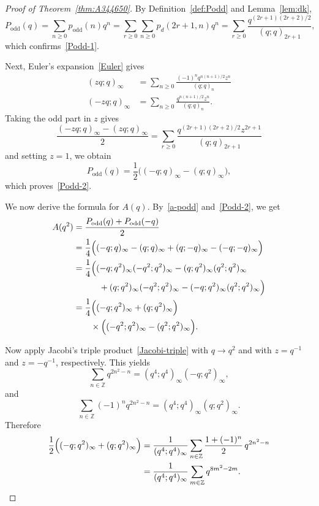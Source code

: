 \documentclass[reqno]{amsart}
\theoremstyle{plain}
\theoremstyle{definition}
\theoremstyle{remark}
\numberwithin{equation}{section}
\newcommand{\qpoch}[2]{(#1;#2)_\infty}
\newcommand{\qpochn}[3]{(#1;#2)_{#3}}
\begin{document}
\begin{proof}[Proof of Theorem~\ref{thm:A344650}]
%
By Definition~\ref{def:Podd} and Lemma~\ref{lem:dk},
\[
P_{\mathrm{odd}}(q)
=\sum_{n\ge 0} p_{\mathrm{odd}}(n)q^n
=\sum_{r\ge 0}\sum_{n\ge 0} p_d(2r+1,n)q^n
=\sum_{r\ge 0}\frac{q^{(2r+1)(2r+2)/2}}{\qpochn{q}{q}{2r+1}},
\]
which confirms~\eqref{Podd-1}.

Next, Euler's expansion~\eqref{Euler} gives
\begin{align*}
\qpoch{zq}{q}
&=\sum_{n\ge 0}\frac{(-1)^n q^{n(n+1)/2}z^n}{\qpochn{q}{q}{n}} \\
\qpoch{-zq}{q}
&=\sum_{n\ge 0}\frac{q^{n(n+1)/2}z^n}{\qpochn{q}{q}{n}}.
\end{align*}
Taking the odd part in $z$ gives
\[
\frac{\qpoch{-zq}{q}-\qpoch{zq}{q}}{2}
=\sum_{r\ge 0}\frac{q^{(2r+1)(2r+2)/2}z^{2r+1}}{\qpochn{q}{q}{2r+1}}
\]
and setting $z=1$, we obtain
\[
P_{\mathrm{odd}}(q)=\frac12\bigl(\qpoch{-q}{q}-\qpoch{q}{q}\bigr),
\]
which proves~\eqref{Podd-2}.

We now derive the formula for $A(q)$. By~\eqref{a-podd} and~\eqref{Podd-2}, we get
\begin{align}
A(q^2)
&=\frac{P_{\mathrm{odd}}(q)+P_{\mathrm{odd}}(-q)}{2} \nonumber\\
&=\frac14\Bigl(\qpoch{-q}{q}-\qpoch{q}{q}+\qpoch{q}{-q}-\qpoch{-q}{-q}\Bigr) \nonumber\\
&=\frac14\Bigl(\qpoch{-q}{q^2}\qpoch{-q^2}{q^2}
-\qpoch{q}{q^2}\qpoch{q^2}{q^2} \nonumber \\
&\qquad\quad
+\qpoch{q}{q^2}\qpoch{-q^2}{q^2}
-\qpoch{-q}{q^2}\qpoch{q^2}{q^2}\Bigr) \nonumber \\
&=\frac14\Bigl(\qpoch{-q}{q^2}+\qpoch{q}{q^2}\Bigr) \\
&\qquad\times \Bigl(\qpoch{-q^2}{q^2}-\qpoch{q^2}{q^2}\Bigr). \label{A-help1}
\end{align}

Now apply Jacobi's triple product~\eqref{Jacobi-triple} with $q\to q^2$ and with $z=q^{-1}$ and $z=-q^{-1}$, respectively. This yields
\[
\sum_{n\in\mathbb Z} q^{2n^2-n}
=(q^4;q^4)_\infty \qpoch{-q}{q^2},
\]
and
\[
\sum_{n\in\mathbb Z} (-1)^n q^{2n^2-n}
=(q^4;q^4)_\infty \qpoch{q}{q^2}.
\]
Therefore
\begin{align}
\frac12\Bigl(\qpoch{-q}{q^2}+\qpoch{q}{q^2}\Bigr)
&=\frac{1}{\qpoch{q^4}{q^4}}
\sum_{n\in\mathbb Z}\frac{1+(-1)^n}{2}\,q^{2n^2-n} \nonumber \\
&=\frac{1}{\qpoch{q^4}{q^4}}
\sum_{m\in\mathbb Z} q^{8m^2-2m}.\label{A-help2}
\end{align}


\end{proof}
\end{document}
